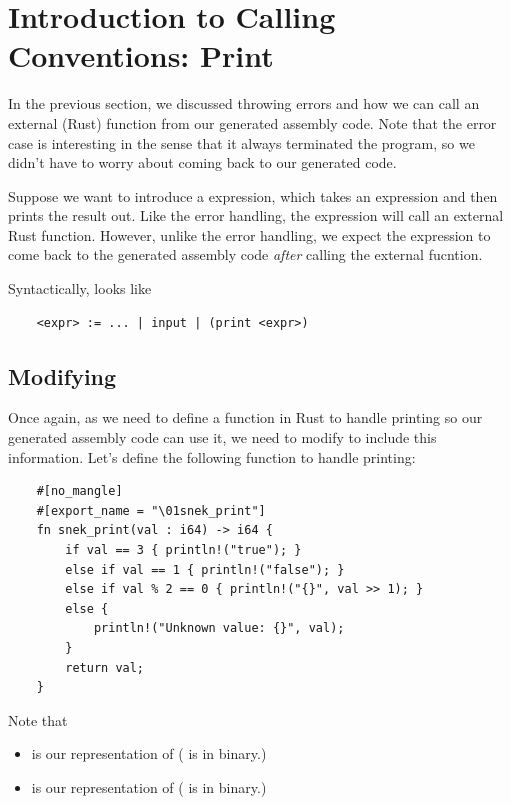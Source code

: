 \documentclass[letterpaper]{article}
\begin{document}
\section{Introduction to Calling Conventions: Print}
In the previous section, we discussed throwing errors and how we can call an external (Rust) function from our generated assembly code. Note that the error case is interesting in the sense that it always terminated the program, so we didn't have to worry about coming back to our generated code.

\bigskip 

Suppose we want to introduce a  expression, which takes an expression and then prints the result out. Like the error handling, the  expression will call an external Rust function. However, unlike the error handling, we expect the  expression to come back to the generated assembly code \emph{after} calling the external fucntion.

\bigskip 

Syntactically,  looks like 
\begin{verbatim}
    <expr> := ... | input | (print <expr>)\end{verbatim}

\subsection{Modifying }
Once again, as we need to define a function in Rust to handle printing so our generated assembly code can use it, we need to modify  to include this information. Let's define the following function to handle printing: 
\begin{verbatim}
    #[no_mangle]
    #[export_name = "\01snek_print"]
    fn snek_print(val : i64) -> i64 {
        if val == 3 { println!("true"); }
        else if val == 1 { println!("false"); }
        else if val % 2 == 0 { println!("{}", val >> 1); }
        else {
            println!("Unknown value: {}", val);
        }
        return val;
    }\end{verbatim}
Note that 
\begin{itemize}
    \item {} is our representation of  ( is  in binary.)
    \item {} is our representation of  ( is  in binary.)
\end{itemize}
\end{document}
